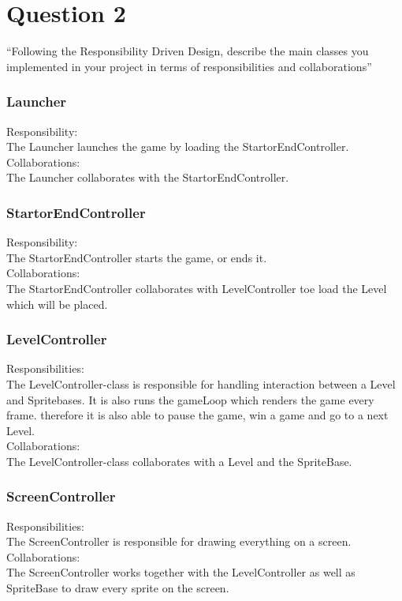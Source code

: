 \section{Question 2}

``Following the Responsibility Driven Design, describe the main classes you implemented in your project in terms of responsibilities and collaborations''

\subsubsection{Launcher}
Responsibility: \\
The Launcher launches the game by loading the StartorEndController. \\
Collaborations: \\
The Launcher collaborates with the StartorEndController. 

\subsubsection{StartorEndController}
Responsibility: \\
The StartorEndController starts the game, or ends it. \\
Collaborations: \\
The StartorEndController collaborates with LevelController toe load the Level which will be placed. 

\subsubsection{LevelController}
Responsibilities: \\
The LevelController-class is responsible for handling interaction between a Level and Spritebases. It is also runs the gameLoop which renders the game every frame. therefore it is also able to pause the game, win a game and go to a next Level. \\
Collaborations: \\
The LevelController-class collaborates with a Level and the SpriteBase.

\subsubsection{ScreenController}
Responsibilities: \\
The ScreenController is responsible for drawing everything on a screen. \\
Collaborations: \\
The ScreenController works together with the LevelController as well as SpriteBase to draw every sprite on the screen. 

